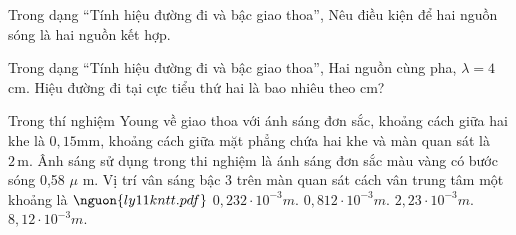 \begin{ex}
Trong dạng “Tính hiệu đường đi và bậc giao thoa”, Nêu điều kiện để hai nguồn sóng là hai nguồn kết hợp.
\choiceTF

\end{ex}

\begin{ex}
Trong dạng “Tính hiệu đường đi và bậc giao thoa”, Hai nguồn cùng pha, $\lambda=4$ cm. Hiệu đường đi tại cực tiểu thứ hai là bao nhiêu theo cm?
\end{ex}

\begin{ex}
Trong thí nghiệm Young về giao thoa với ánh sáng đơn sắc, khoảng cách giữa hai khe là $0,15 \mathrm{mm}$, khoảng cách giữa mặt phẳng chứa hai khe và màn quan sát là $2\,\text{m}$. Ânh sáng sử dụng trong thi nghiệm là ánh sáng đơn sắc màu vàng có bước sóng 0,58 $\mu$ m. Vị trí vân sáng bậc 3 trên màn quan sát cách vân trung tâm một khoảng là $\nguon{ly11 kntt.pdf}$
\choice
{$0,232 \cdot  10^{-3} m.$}
{$0,812 \cdot  10^{-3} m.$}
{\True $2,23 \cdot  10^{-3} m.$}
{$8,12 \cdot  10^{-3} m.$}
\end{ex}

